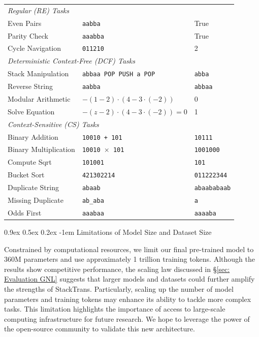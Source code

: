 \documentclass{article}
\makeatletter
\providecommand{\paragraph}{}
\renewcommand{\paragraph}[1]{%
  \@startsection{paragraph}{4}{\z@}%
                {0.9ex \@plus 0.5ex \@minus 0.2ex}%
                {-1em}%
                {\normalsize\bfseries}%
  {#1}
}
\DeclareRobustCommand{\method}{{\sc StackTrans}\xspace}
\makeatother
\begin{document}
\begin{table}[t]
\begin{tabular}{lll}
\midrule
\multicolumn{3}{l}{\textit{Regular (RE) Tasks}} \\
Even Pairs         & \texttt{aabba}         & True \\
Parity Check       & \texttt{aaabba}        & True \\
Cycle Navigation   & \texttt{011210}        & 2 \\
\midrule
\multicolumn{3}{l}{\textit{Deterministic Context-Free (DCF) Tasks}} \\
Stack Manipulation & \texttt{abbaa POP PUSH a POP} & \texttt{abba} \\
Reverse String     & \texttt{aabba}         & \texttt{abbaa} \\
Modular Arithmetic & $-(1 - 2) \cdot (4 - 3 \cdot (-2))$ & 0 \\
Solve Equation     & $-(z - 2) \cdot (4 - 3 \cdot (-2)) = 0$ & 1 \\
\midrule
\multicolumn{3}{l}{\textit{Context-Sensitive (CS) Tasks}} \\
Binary Addition    & \texttt{10010 + 101}   & \texttt{10111} \\
Binary Multiplication & \texttt{10010 $\times$ 101} & \texttt{1001000} \\
Compute Sqrt       & \texttt{101001}        & \texttt{101} \\
Bucket Sort        & \texttt{421302214}     & \texttt{011222344} \\
Duplicate String   & \texttt{abaab}         & \texttt{abaababaab} \\
Missing Duplicate  & \texttt{ab\_aba}       & \texttt{a} \\
Odds First         & \texttt{aaabaa}        & \texttt{aaaaba} \\
\bottomrule
\end{tabular}
\end{table}

\paragraph{Limitations of Model Size and Dataset Size}  
Constrained by computational resources, we limit our final pre-trained model to 360M parameters and use approximately 1 trillion training tokens. 
Although the results show competitive performance, the scaling law discussed in \S\ref{sec: Evaluation GNL} suggests that larger models and datasets could further amplify the strengths of \method. 
Particularly, scaling up the number of model parameters and training tokens may enhance its ability to tackle more complex tasks. 
This limitation highlights the importance of access to large-scale computing infrastructure for future research. 
We hope to leverage the power of the open-source community to validate this new architecture.
\end{document}
